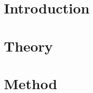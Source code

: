 \documentclass[main.tex]{subfiles}
\begin{document}
\chapter{Introduction}


\chapter{Theory}


\chapter{Method}


\end{document}

